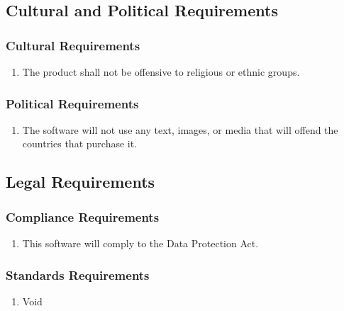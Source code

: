\documentclass[]{article}
\begin{document}

\subsection{Cultural and Political Requirements}
\label{sub:cultural_and_political_requirements}

\subsubsection{Cultural Requirements}
\label{ssub:cultural_requirements}
\begin{enumerate}[{CP}1. ]
	\item The product shall not be offensive to religious or ethnic groups.
\end{enumerate}

\subsubsection{Political Requirements}
\label{ssub:political_requirements}
\begin{enumerate}[{CP}1. ]
	\item The software will not use any text, images, or media that will offend the countries that purchase it.

\end{enumerate}


\subsection{Legal Requirements}
\label{sub:legal_requirements}

\subsubsection{Compliance Requirements}
\label{ssub:compliance_requirements}
\begin{enumerate}[{LR}1. ]
	\item  This software will comply to the Data Protection Act.
\end{enumerate}

\subsubsection{Standards Requirements}
\label{ssub:standards_requirements}
\begin{enumerate}[{LR}1. ]
	\item Void
\end{enumerate}
\end{document}
